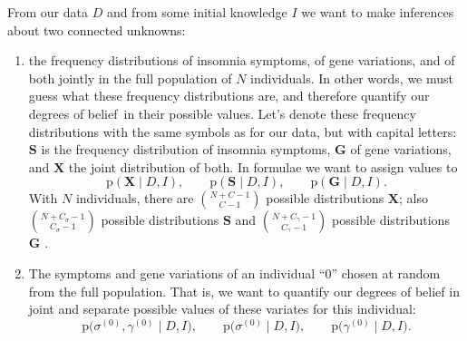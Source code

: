 \documentclass[\ifafour a4paper,12pt,\else a5paper,10pt,\fi%
onecolumn,oneside,article,%
british%
]{memoir}
\theoremstyle{remark}
\theoremstyle{innote}
\newcommand*{\citep}{\parencites}
\newcommand*{\pf}{\mathrm{p}}%
\renewcommand*{\|}{\mathpunct{|}}
\newcommand*{\sect}{\S}%
\newcommand*{\dobs}{degrees of belief}
\newcommand*{\yD}{D}
\newcommand*{\yI}{I}
\newcommand*{\ys}{\sigma}
\newcommand*{\yg}{\gamma}
\newcommand*{\ysi}[1]{\ys^{(#1)}}
\newcommand*{\ygi}[1]{\yg^{(#1)}}
\newcommand*{\yso}{\ysi{0}}
\newcommand*{\ygo}{\ygi{0}}
\newcommand*{\yFs}{\bm{S}}
\newcommand*{\yFg}{\bm{G}}
\newcommand*{\yF}{\bm{X}}
\newcommand*{\yCs}{C_{\sigma}}
\newcommand*{\yCg}{C_{\gamma}}
\begin{document}
\medskip

From our data $\yD$ and from some initial knowledge $\yI$ we want to make
inferences about two connected unknowns:
\begin{enumerate}[label=(\alph*)]
\item the frequency distributions of insomnia symptoms, of gene variations,
  and of both jointly in the full population of $N$ individuals. In other
  words, we must guess what these frequency distributions are, and
  therefore quantify our \dobs\ in their
  possible values. Let's denote these frequency distributions with the same
  symbols as for our data, but with capital letters: $\yFs$ is the
  frequency distribution of insomnia symptoms, $\yFg$ of gene variations,
  and $\yF$ the joint distribution of both. In formulae we want to assign
  values to
  \begin{equation}
    \label{eq:goal_plausibilities}
    \pf(\yF \| \yD,\yI),\qquad
    \pf(\yFs \| \yD,\yI),\qquad
    \pf(\yFg \| \yD,\yI).
  \end{equation}
  With $N$ individuals, there are $\binom{N+C-1}{C-1}$ possible
  distributions $\yF$; also $\binom{N+\yCs-1}{\yCs-1}$ possible
  distributions $\yFs$  and $\binom{N+\yCg-1}{\yCg-1}$ possible
  distributions $\yFg$ \citep[\sect~2.1]{csiszaretal2004b}.
\item The symptoms and gene variations of an individual \enquote{$0$}
  chosen at random from the full population. That is, we want to quantify
  our degrees of belief in joint and separate possible values of these
  variates for this individual:
  \begin{equation}
    \label{eq:goal_ind_plausibilities}
    \pf\bigl( \ysi{0}, \ygi{0} \| \yD, \yI \bigr),\qquad
    \pf\bigl( \ysi{0} \| \yD, \yI \bigr),\qquad
    \pf\bigl(  \ygi{0} \| \yD, \yI \bigr).
  \end{equation}
\end{enumerate}



\end{document}
